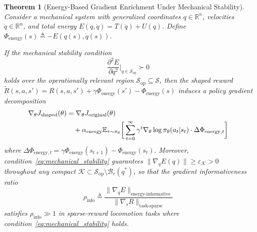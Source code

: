 \documentclass[journal]{IEEEtran}
\newtheorem{theorem}{Theorem}[section]
\begin{document}
	\begin{theorem}[Energy-Based Gradient Enrichment Under Mechanical Stability]
		\label{thm:energy_convergence}
		Consider a mechanical system with generalized coordinates $q\in\mathbb{R}^n$, velocities $\dot{q}\in\mathbb{R}^n$, and total energy $E(q,\dot{q}) = T(\dot{q}) + U(q)$. Define $\Phi_{\text{energy}}(s) \triangleq -E(q(s),\dot{q}(s))$.
		
		If the mechanical stability condition
		\begin{equation}
			\frac{\partial^2 E}{\partial q^2}\bigg|_{q \in \mathcal{S}_{\text{op}}} \succ 0
			\label{eq:mechanical_stability}
		\end{equation}
		holds over the operationally relevant region $\mathcal{S}_{\text{op}}\subseteq\mathcal{S}$, then the shaped reward $\tilde{R}(s,a,s') = R(s,a,s') + \gamma\Phi_{\text{energy}}(s') - \Phi_{\text{energy}}(s)$ induces a policy gradient decomposition
		\begin{align}
			\nabla_\theta J_{\text{shaped}}(\theta) &= \nabla_\theta J_{\text{original}}(\theta) \notag \\
			&\quad + \alpha_{\text{energy}} \mathbb{E}_{\tau\sim\pi_\theta} \bigg[ \sum_{t=0}^{\infty} \gamma^t \nabla_\theta \log \pi_\theta(a_t|s_t) \cdot \Delta\Phi_{\text{energy},t} \bigg]
			\label{eq:gradient_decomposition}
		\end{align}
		where $\Delta\Phi_{\text{energy},t} = \gamma\Phi_{\text{energy}}(s_{t+1}) - \Phi_{\text{energy}}(s_t)$. Moreover, condition~\eqref{eq:mechanical_stability} guarantees $\|\nabla_q E(q)\| \geq \varepsilon_{\mathcal{K}} > 0$ throughout any compact $\mathcal{K}\subset\mathcal{S}_{\text{op}}\setminus\mathcal{B}_r(q^*)$, so that the gradient informativeness ratio
		\begin{equation}
			\rho_{\text{info}} \triangleq \frac{\|\nabla_q E\|_{\text{energy-informative}}}{\|\nabla_s R\|_{\text{task-sparse}}}
			\label{eq:gradient_ratio}
		\end{equation}
		satisfies $\rho_{\text{info}} \gg 1$ in sparse-reward locomotion tasks where condition~\eqref{eq:mechanical_stability} holds.
	\end{theorem}
	
\end{document}
